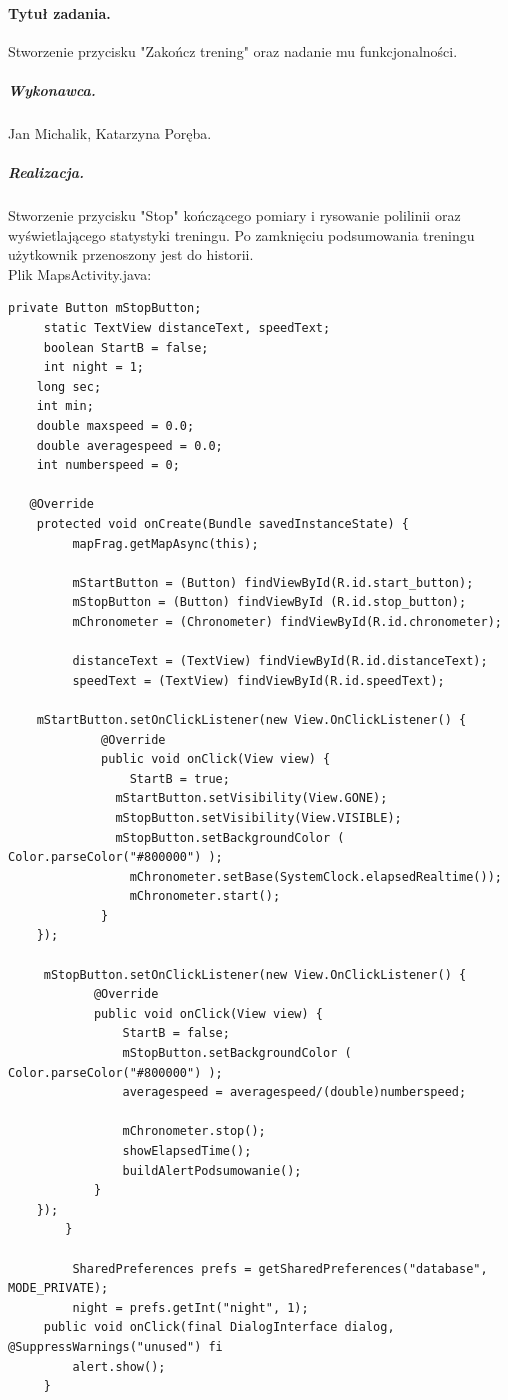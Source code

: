 \documentclass[a4paper]{article}
\begin{document}
\paragraph{Tytuł zadania.} Stworzenie przycisku "Zakończ trening" oraz nadanie mu funkcjonalności.
\subparagraph{Wykonawca.} Jan Michalik, Katarzyna Poręba.
\subparagraph{Realizacja.} Stworzenie przycisku "Stop" kończącego pomiary i rysowanie polilinii oraz wyświetlającego statystyki treningu. Po zamknięciu podsumowania treningu użytkownik przenoszony jest do historii.\\
Plik MapsActivity.java:
\begin{lstlisting}[style=java]
private Button mStopButton;
     static TextView distanceText, speedText;
     boolean StartB = false;
     int night = 1;
    long sec;
    int min;
    double maxspeed = 0.0;
    double averagespeed = 0.0;
    int numberspeed = 0;

   @Override
    protected void onCreate(Bundle savedInstanceState) {
         mapFrag.getMapAsync(this);
 
         mStartButton = (Button) findViewById(R.id.start_button);
         mStopButton = (Button) findViewById (R.id.stop_button);
         mChronometer = (Chronometer) findViewById(R.id.chronometer);

         distanceText = (TextView) findViewById(R.id.distanceText);
         speedText = (TextView) findViewById(R.id.speedText);

   	mStartButton.setOnClickListener(new View.OnClickListener() {
             @Override
             public void onClick(View view) {
                 StartB = true;
               mStartButton.setVisibility(View.GONE);
               mStopButton.setVisibility(View.VISIBLE);
               mStopButton.setBackgroundColor ( Color.parseColor("#800000") );
                 mChronometer.setBase(SystemClock.elapsedRealtime());
                 mChronometer.start();
             }
	});

	 mStopButton.setOnClickListener(new View.OnClickListener() {
            @Override
            public void onClick(View view) {
                StartB = false;
                mStopButton.setBackgroundColor ( Color.parseColor("#800000") );
                averagespeed = averagespeed/(double)numberspeed;

                mChronometer.stop();
                showElapsedTime();
                buildAlertPodsumowanie();
            }
	});
        }

         SharedPreferences prefs = getSharedPreferences("database", MODE_PRIVATE);
         night = prefs.getInt("night", 1);
     public void onClick(final DialogInterface dialog, @SuppressWarnings("unused") fi
         alert.show();
     }
 

\end{lstlisting}
\end{document}
